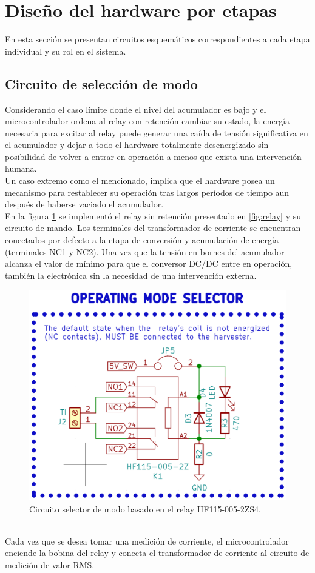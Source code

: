 \section{Diseño del hardware por etapas}
En esta sección se presentan circuitos esquemáticos correspondientes a cada etapa individual y su rol en el sistema.
\subsection{Circuito de selección de modo}
Considerando el caso límite donde el nivel del acumulador es bajo y el microcontrolador ordena al relay con retención cambiar su estado, la energía necesaria para excitar al relay puede generar una caída de tensión significativa en el acumulador y dejar a todo el hardware totalmente desenergizado sin posibilidad de volver a entrar en operación a menos que exista una intervención humana.\\
Un caso extremo como el mencionado, implica que el hardware posea un mecanismo para restablecer su operación tras largos per\'{i}odos de tiempo aun después de haberse vaciado el acumulador.\\
En la figura \ref{fig:ctoselecciondemodo} se implementó el relay sin retención presentado en \ref{fig:relay} y su circuito de mando. Los terminales del transformador de corriente se encuentran conectados por defecto a la etapa de conversión y acumulación de energía (terminales NC1 y NC2). Una vez que la tensión en bornes del acumulador alcanza el valor de mínimo para que el conversor DC/DC entre en operación, también la electrónica sin la necesidad de una intervención externa.\\
\begin{figure}[h]
	\centering
	\includegraphics[width=0.8\linewidth]{Figures/cto_seleccion_de_modo}
	\caption{Circuito selector de modo basado en el relay HF115-005-2ZS4.}
	\label{fig:ctoselecciondemodo}
\end{figure}\\
Cada vez que se desea tomar una medición de corriente, el microcontrolador enciende la bobina del relay y conecta el transformador de corriente al circuito de medición de valor RMS.\\

